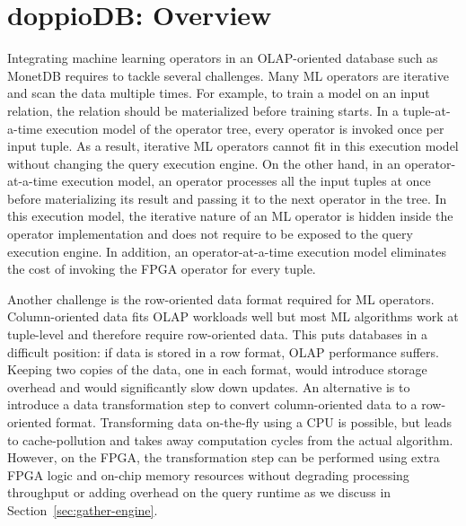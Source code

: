 \documentclass[11pt,dvipdfm]{article}
\begin{document}
\section{doppioDB: Overview}\label{sec:vision}

Integrating machine learning operators in an OLAP-oriented database such as MonetDB requires to tackle several challenges. Many ML operators are iterative and scan the data multiple times. For example, to train a model on an input relation, the relation should be materialized before training starts. In a tuple-at-a-time execution model of the operator tree, every operator is invoked once per input tuple. As a result, iterative ML operators cannot fit in this execution model without changing the query execution engine. On the other hand, in an operator-at-a-time execution model, an operator processes all the input tuples at once before materializing its result and passing it to the next operator in the tree. In this execution model, the iterative nature of an ML operator is hidden inside the operator implementation and does not require to be exposed to the query execution engine. In addition, an operator-at-a-time execution model eliminates the cost of invoking the FPGA operator for every tuple. %

Another challenge is the row-oriented data format required for ML operators. Column-oriented data fits OLAP workloads well but most ML algorithms work at tuple-level and therefore require row-oriented data. This puts databases in a difficult position: if data is stored in a row format, OLAP performance suffers. Keeping two copies of the data, one in each format, would introduce storage overhead and would significantly slow down updates. An alternative is to introduce a data transformation step to convert column-oriented data to a row-oriented format.
Transforming data on-the-fly using a CPU is possible, but leads to cache-pollution and takes away computation cycles from the actual algorithm. However, on the FPGA, the transformation step can be performed using extra FPGA logic and on-chip memory resources without degrading processing throughput or adding overhead on the query runtime as we discuss in Section~\ref{sec:gather-engine}. 

\end{document}
